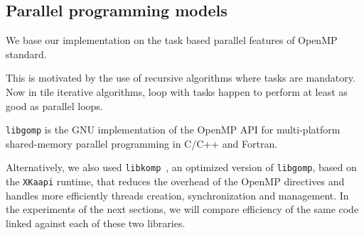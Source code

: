 \documentclass{article}
\newcommand{\libkomp}{\texttt{libkomp}\xspace}
\newcommand{\libgomp}{\texttt{libgomp}\xspace}
\newcommand{\xkaapi}{\texttt{XKaapi}\xspace}
\begin{document}
 
\subsection{Parallel programming models}

We base our implementation on the task based parallel features of OpenMP
standard.
 
This is motivated by the use of recursive algorithms where tasks are
mandatory. Now in tile iterative algorithms, loop with tasks happen to perform
at least as good as parallel loops.
 
 

 
 
 
 
 
 
 
 
 
 
 
 
 
 
 
 
 

\libgomp is the GNU implementation of the OpenMP API for multi-platform
shared-memory parallel programming in C/C++ and Fortran. 
 
 
 
Alternatively, we also used
\libkomp~\cite{BGD12}, an optimized version of \libgomp, based on the \xkaapi runtime,
that reduces the overhead of the OpenMP directives and handles more
efficiently threads creation, synchronization and management.
In the experiments of the next sections, we will compare efficiency of the same
code linked against each of these two libraries. 

 
 
 
 
 
 
 
 
 
 
 
 
 
 
 

 
 
 
 
 
 
 
 


 
 
 

 
 
 
 
 
 
 
 
 
 
 
 
 
 
\end{document}
